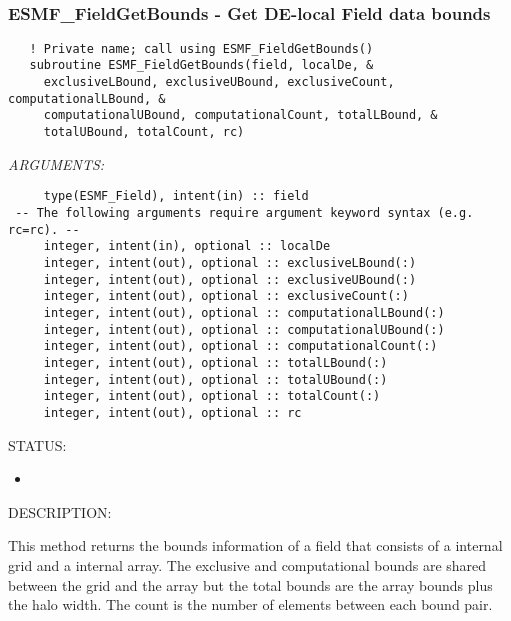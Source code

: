  
\mbox{}\hrulefill\ 
 
\subsubsection [ESMF\_FieldGetBounds] {ESMF\_FieldGetBounds - Get DE-local Field data bounds}


\begin{verbatim}   ! Private name; call using ESMF_FieldGetBounds()
   subroutine ESMF_FieldGetBounds(field, localDe, &
     exclusiveLBound, exclusiveUBound, exclusiveCount, computationalLBound, &
     computationalUBound, computationalCount, totalLBound, &
     totalUBound, totalCount, rc)\end{verbatim}{\em ARGUMENTS:}
\begin{verbatim}     type(ESMF_Field), intent(in) :: field
 -- The following arguments require argument keyword syntax (e.g. rc=rc). --
     integer, intent(in), optional :: localDe
     integer, intent(out), optional :: exclusiveLBound(:)
     integer, intent(out), optional :: exclusiveUBound(:)
     integer, intent(out), optional :: exclusiveCount(:)
     integer, intent(out), optional :: computationalLBound(:)
     integer, intent(out), optional :: computationalUBound(:)
     integer, intent(out), optional :: computationalCount(:)
     integer, intent(out), optional :: totalLBound(:)
     integer, intent(out), optional :: totalUBound(:)
     integer, intent(out), optional :: totalCount(:)
     integer, intent(out), optional :: rc\end{verbatim}
{\sf STATUS:}
   \begin{itemize}
   \item{}
   \end{itemize}
  
{\sf DESCRIPTION:\\ }


   This method returns the bounds information of a field that consists of a
   internal grid and a internal array. The exclusive and computational bounds
   are shared between the grid and the array but the total bounds are the array
   bounds plus the halo width. The count is the number of elements between each
   bound pair.
  
